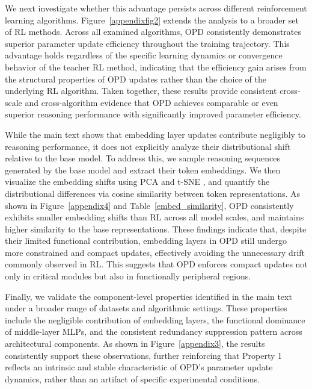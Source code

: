 \documentclass{article}
\begin{document}
We next investigate whether this advantage persists across different reinforcement learning algorithms. Figure~\ref{appendixfig2} extends the analysis to a broader set of RL methods. Across all examined algorithms, OPD consistently demonstrates superior parameter update efficiency throughout the training trajectory. This advantage holds regardless of the specific learning dynamics or convergence behavior of the teacher RL method, indicating that the efficiency gain arises from the structural properties of OPD updates rather than the choice of the underlying RL algorithm. Taken together, these results provide consistent cross-scale and cross-algorithm evidence that OPD achieves comparable or even superior reasoning performance with significantly improved parameter efficiency.

While the main text shows that embedding layer updates contribute negligibly to reasoning performance, it does not explicitly analyze their distributional shift relative to the base model. To address this, we sample reasoning sequences generated by the base model and extract their token embeddings. We then visualize the embedding shifts using PCA \citep{Eckart1936TheAO} and t-SNE \citep{shi2021visualizingdatausinggtsne}, and quantify the distributional differences via cosine similarity between token representations. As shown in Figure~\ref{appendix4} and Table~\ref{embed_similarity}, OPD consistently exhibits smaller embedding shifts than RL across all model scales, and maintains higher similarity to the base representations. These findings indicate that, despite their limited functional contribution, embedding layers in OPD still undergo more constrained and compact updates, effectively avoiding the unnecessary drift commonly observed in RL. This suggests that OPD enforces compact updates not only in critical modules but also in functionally peripheral regions.

Finally, we validate the component-level properties identified in the main text under a broader range of datasets and algorithmic settings. These properties include the negligible contribution of embedding layers, the functional dominance of middle-layer MLPs, and the consistent redundancy suppression pattern across architectural components. As shown in Figure~\ref{appendix3}, the results consistently support these observations, further reinforcing that Property 1 reflects an intrinsic and stable characteristic of OPD's parameter update dynamics, rather than an artifact of specific experimental conditions.
\end{document}
